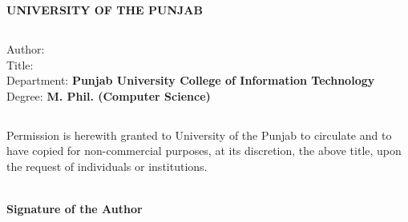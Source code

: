 



%

\begin{center}
\textbf{ UNIVERSITY OF THE PUNJAB } %
\end{center}


\subsection*{} 
\vspace{7mm}
Author: \hspace{10mm} %
\textbf{}  \\
Title: \hspace{13mm}
\textbf{ } \\ 
Department: \quad
\textbf{Punjab University College of Information Technology}\\ 
Degree: \hspace{7mm}
\textbf{\quad M. Phil. (Computer Science)}\\ 


\subsection*{}
Permission is herewith granted to University of the Punjab to circulate and to have copied for non-commercial purposes, at its discretion, the above title, upon the request of individuals or institutions. 
\\ \\ 
\begin{flushright}
\textbf{Signature of the Author}
\end{flushright}
 
